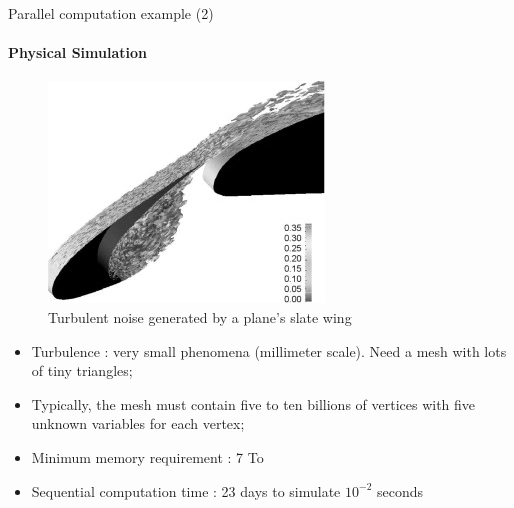 \documentclass[compress,10pt,aspectratio=169]{beamer}
\begin{document}
\begin{frame}[fragile]{Parallel computation example (2)}
    \framesubtitle{Physical Simulation}
    \small
    \begin{multicols}{2}
        \begin{figure}[h]
            \includegraphics[width=\linewidth]{../Images/SlatWingTurb1.jpg}
            \caption{Turbulent noise generated by a plane's slate wing}
        \end{figure}

        \begin{itemize}
            \item Turbulence : very small phenomena (millimeter scale). Need a mesh with lots of tiny triangles;
            \item Typically, the mesh must contain five to ten billions of vertices with five unknown variables for each vertex; 
            \item Minimum memory requirement : 7 To 
            \item Sequential computation time : 23 days to simulate $10^{-2}$ seconds
        \end{itemize}
    \end{multicols}
\end{frame}
\end{document}
